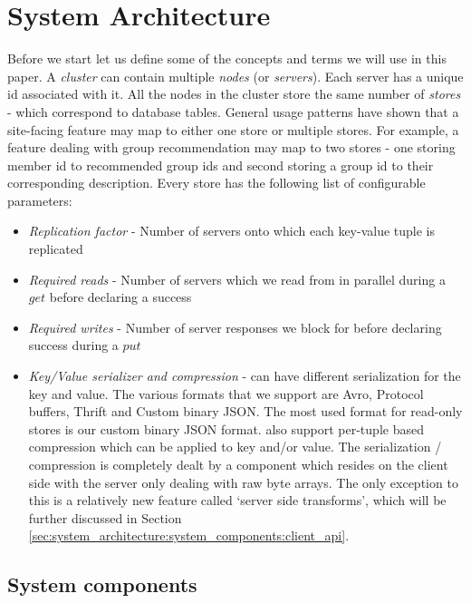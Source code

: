 \documentclass[10pt,twocolumn,preprint,nonatbib,numbers]{sigplanconf}
\begin{document}
\section{System Architecture}
\label{sec:system_architecture}

Before we start let us define some of the concepts and terms we will use in this paper. A \projectname{} \emph{cluster} can contain multiple \emph{nodes} (or \emph{servers}). Each server has a unique id associated with it. All the nodes in the cluster store the same number of \emph{stores} - which correspond to database tables. General usage patterns have shown that a site-facing feature may map to either one store or multiple stores. For example, a feature dealing with group recommendation may map to two stores - one storing member id to recommended group ids and second storing a group id to their corresponding description. Every store has the following list of configurable parameters:
\begin{itemize}
	\item \emph {Replication factor} - Number of servers onto which each key-value tuple is replicated
	\item \emph {Required reads} - Number of servers which we read from in parallel during a $get$ before declaring a success
	\item \emph {Required writes} - Number of server responses we block for before declaring success during a $put$
	\item \emph {Key/Value serializer and compression} - \projectname{} can have different serialization for the key and value. The various formats that we support are Avro, Protocol buffers, Thrift and Custom binary JSON. The most used format for read-only stores is our custom binary JSON format. \projectname{} also support per-tuple based compression which can be applied to key and/or value. The serialization / compression is completely dealt by a component which resides on the client side with the server only dealing with raw byte arrays. The only exception to this is a relatively new feature called `server side transforms', which will be further discussed in Section \ref{sec:system_architecture:system_components:client_api}. 
\end{itemize}



\subsection{System components}
\label{sec:system_architecture:system_components}
\end{document}
